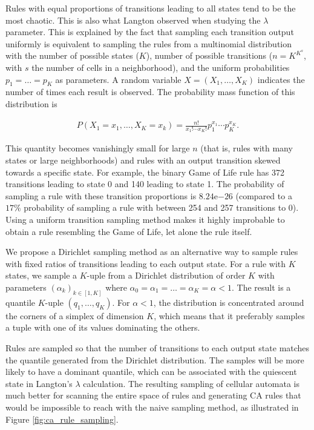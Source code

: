 Rules with equal proportions of transitions leading to all states tend to be the
most chaotic. This is also what Langton observed when studying the $\lambda$
parameter. This is explained by the fact that sampling each transition output
uniformly is equivalent to sampling the rules from a multinomial distribution
with the number of possible states ($K$), number of possible transitions
($n = K^{K^{s}}$, with $s$ the number of cells in a neighborhood), and the uniform
probabilities $p_{1}= \ldots= p_{K}$ as parameters. A random variable
$X = (X_{1}, \ldots, X_{K})$ indicates the number of times each result is observed.
The probability mass function of this distribution is

\begin{equation}
  \label{eq:multinomial}
  \begin{aligned}
    P(X_{1}=x_{1}, \ldots , X_{K}=x_{k}) = \frac{n!}{x_{1}!\cdots x_{K}!} p_{1}^{x_{1}}\cdots p_{K}^{x_{K}}.
  \end{aligned}
\end{equation}

This quantity becomes vanishingly small for large $n$ (that is, rules with many
states or large neighborhoods) and rules with an output transition skewed
towards a specific state. For example, the binary Game of Life rule has 372
transitions leading to state 0 and 140 leading to state 1. The probability
of sampling a rule with these transition proportions is $8.24\mathrm{e}{-26}$
(compared to a $17\%$ probability of sampling a rule with between 254 and 257
transitions to 0). Using a uniform transition sampling method makes it highly 
improbable to obtain a rule resembling the Game of Life, let alone the rule itself.

We propose a Dirichlet sampling method as an alternative way to sample rules
with fixed ratios of transitions leading to each output state. For a rule with
$K$ states, we sample a $K$-uple from a Dirichlet distribution of order $K$ with
parameters $(\alpha_{k})_{k\in [1, K]}$ where $\alpha_{0} = \alpha_{1} = \ldots = \alpha_{K} = \alpha < 1$. The
result is a quantile $K$-uple $(q_{1}, \ldots, q_{K})$. For $\alpha < 1$, the distribution
is concentrated around the corners of a simplex of dimension $K$, which means
that it preferably samples a tuple with one of its values dominating the others.

Rules are sampled so that the number of transitions to each output state matches
the quantile generated from the Dirichlet distribution. The samples will be more
likely to have a dominant quantile, which can be associated with the quiescent
state in Langton's $\lambda$ calculation. The resulting sampling of cellular automata
is much better for scanning the entire space of rules and generating \ac{CA}
rules that would be impossible to reach with the naive sampling method, as illustrated
in Figure \ref{fig:ca_rule_sampling}.

